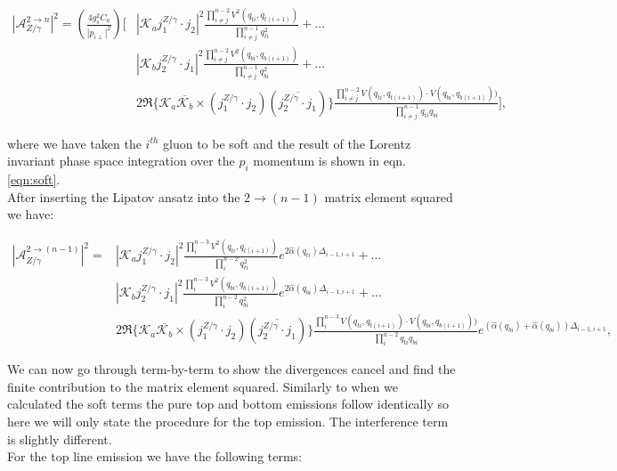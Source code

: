		\begin{align}
			|\mathcal{A}_{Z/\gamma}^{2\rightarrow n}|^2 = \left(\frac{4g_s^2C_a}{|p_{i\perp}|^2}\right)
				\Bigg[&\left|\mathcal{K}_a j_1^{Z/\gamma}\cdot j_2\right|^2 \frac{\prod^{n-2}_{i\neq j}V^2(q_{ti},
				q_{t(i+1)})}{\prod^{n-1}_{i\neq j}q^2_{ti}} + \ldots \\&\left|\mathcal{K}_b j_2^{Z/\gamma}\cdot j_1\right|^2
				\frac{\prod^{n-2}_{i\neq j}V^2(q_{bi}, q_{b(i+1)})}{\prod^{n-1}_{i\neq j}q^2_{bi}} + \ldots \\
				&2\Re\{\mathcal{K}_a\overline{\mathcal{K}_b} \times (j_1^{Z/\gamma}\cdot j_2)(\overline{j_2^{Z/\gamma}\cdot j_1})\}
				\frac{\prod^{n-2}_{i\neq j}V(q_{ti}, q_{t(i+1)})\cdot V(q_{bi}, q_{b(i+1)}))}{\prod^{n-1}_{i\neq j}q_{ti}q_{bi}}\Bigg],
		\end{align}

		where we have taken the $i^{th}$ gluon to be soft and the result of the Lorentz invariant phase space
		integration over the $p_i$ momentum is shown in eqn. \eqref{eqn:soft}.\\After inserting the Lipatov
		ansatz into the $2\rightarrow (n-1)$ matrix element squared we have:

		\begin{align}
			|\mathcal{A}_{Z/\gamma}^{2\rightarrow (n-1)}|^2 = &\left|\mathcal{K}_a j_1^{Z/\gamma}\cdot j_2\right|^2
				\frac{\prod^{n-3}_{i}V^2(q_{ti}, q_{t(i+1)})}{\prod^{n-2}_{i}q^2_{ti}}e^{2\hat{\alpha}(q_{ti})\Delta_{i-1,i+1}} + \ldots \\
				&\left|\mathcal{K}_b j_2^{Z/\gamma}\cdot j_1\right|^2 \frac{\prod^{n-3}_{i}V^2(q_{bi}, q_{b(i+1)})}
				{\prod^{n-2}_{i}q^2_{bi}}e^{2\hat{\alpha}(q_{bi})\Delta_{i-1,i+1}} + \ldots \\
				&2\Re\{\mathcal{K}_a\overline{\mathcal{K}_b} \times (j_1^{Z/\gamma}\cdot j_2)(\overline{j_2^{Z/\gamma}\cdot j_1})\}
				\frac{\prod^{n-3}_{i}V(q_{ti}, q_{t(i+1)})\cdot V(q_{bi}, q_{b(i+1)}))}{\prod^{n-2}_{i}q_{ti}q_{bi}}
				e^{(\hat{\alpha}(q_{bi}) + \hat{\alpha}(q_{bi}))\Delta_{i-1,i+1}},
		\end{align}

		We can now go through term-by-term to show the divergences cancel and find the finite contribution to
		the matrix element squared.  Similarly to when we calculated the soft terms the pure top and bottom
		emissions follow identically so here we will only state the procedure for the top emission.  The
		interference term is slightly different.\\For the top line emission we have the following terms:

